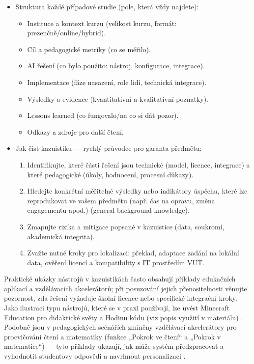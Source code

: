\documentclass{report}%
\begin{document}
\begin{itemize}
  \item Struktura každé případové studie (pole, která vždy najdete):
    \begin{itemize}
      \item Instituce a kontext kurzu (velikost kurzu, formát: prezenčně/online/hybrid).
      \item Cíl a pedagogické metriky (co se měřilo).
      \item AI řešení (co bylo použito: nástroj, konfigurace, integrace).
      \item Implementace (fáze nasazení, role lidí, technická integrace).
      \item Výsledky a evidence (kvantitativní a kvalitativní poznatky).
      \item Lessons learned (co fungovalo/na co si dát pozor).
      \item Odkazy a zdroje pro další čtení.
    \end{itemize}
  \item Jak číst kazuistiku — rychlý průvodce pro garanta předmětu:
    \begin{enumerate}
      \item Identifikujte, které části řešení jsou technické (model, licence, integrace) a které pedagogické (úkoly, hodnocení, procesní důkazy).
      \item Hledejte konkrétní měřitelné výsledky nebo indikátory úspěchu, které lze reprodukovat ve vašem předmětu (např. čas na opravu, změna engagementu apod.) (general background knowledge).
      \item Zmapujte rizika a mitigace popsané v kazuistice (data, soukromí, akademická integrita).
      \item Zvažte nutné kroky pro lokalizaci: překlad, adaptace zadání na lokální data, ověření licencí a kompatibility s IT prostředím VUT.
    \end{enumerate}
\end{itemize}

Praktické ukázky nástrojů v kazuistikách často obsahují příklady edukačních aplikací a vzdělávacích akcelerátorů; při posuzování jejich přenositelnosti věnujte pozornost, zda řešení vyžaduje školní licence nebo specifické integrační kroky. Jako ilustraci typu nástrojů, které se v praxi používají, lze uvést Minecraft Education pro didaktické světy a Hodinu kódu (viz popis využití v materiálu) \cite{kb_ai_101_tipu_pdf_04e4a115_page_15_2}. Podobně jsou v pedagogických scénářích zmíněny vzdělávací akcelerátory pro procvičování čtení a matematiky (funkce „Pokrok ve čtení“ a „Pokrok v matematice“) — tyto příklady ukazují, jak může systém předzpracovat a vyhodnotit studentovy odpovědi a navrhnout personalizaci \cite{kb_ai_101_tipu_pdf_04e4a115_page_7_1, kb_ai_101_tipu_pdf_04e4a115_page_8_1}.
  
\end{document}
